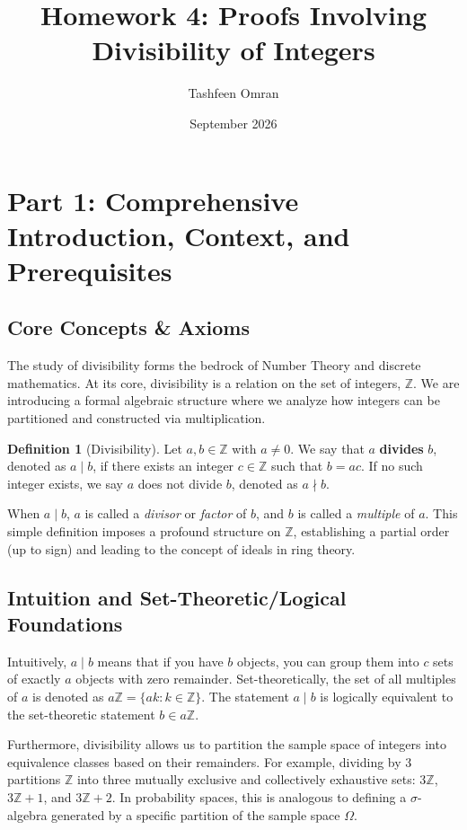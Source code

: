 \documentclass[11pt]{article}
\title{\textbf{Homework 4: Proofs Involving Divisibility of Integers}}
\author{Tashfeen Omran}
\date{September 2026}
\theoremstyle{definition}
\newtheorem{definition}{Definition}[section]
\theoremstyle{remark}
\newcommand{\Z}{\mathbb{Z}}
\begin{document}
\maketitle
\tableofcontents
\newpage

\section{Part 1: Comprehensive Introduction, Context, and Prerequisites}

\subsection{Core Concepts \& Axioms}
The study of divisibility forms the bedrock of Number Theory and discrete mathematics. At its core, divisibility is a relation on the set of integers, $\Z$. We are introducing a formal algebraic structure where we analyze how integers can be partitioned and constructed via multiplication.

\begin{definition}[Divisibility]
Let $a, b \in \Z$ with $a \neq 0$. We say that $a$ \textbf{divides} $b$, denoted as $a \mid b$, if there exists an integer $c \in \Z$ such that $b = ac$. If no such integer exists, we say $a$ does not divide $b$, denoted as $a \nmid b$.
\end{definition}

When $a \mid b$, $a$ is called a \textit{divisor} or \textit{factor} of $b$, and $b$ is called a \textit{multiple} of $a$. This simple definition imposes a profound structure on $\Z$, establishing a partial order (up to sign) and leading to the concept of ideals in ring theory.

\subsection{Intuition and Set-Theoretic/Logical Foundations}
Intuitively, $a \mid b$ means that if you have $b$ objects, you can group them into $c$ sets of exactly $a$ objects with zero remainder. Set-theoretically, the set of all multiples of $a$ is denoted as $a\Z = \{ak : k \in \Z\}$. The statement $a \mid b$ is logically equivalent to the set-theoretic statement $b \in a\Z$. 

Furthermore, divisibility allows us to partition the sample space of integers into equivalence classes based on their remainders. For example, dividing by $3$ partitions $\Z$ into three mutually exclusive and collectively exhaustive sets: $3\Z$, $3\Z + 1$, and $3\Z + 2$. In probability spaces, this is analogous to defining a $\sigma$-algebra generated by a specific partition of the sample space $\Omega$.
\end{document}
